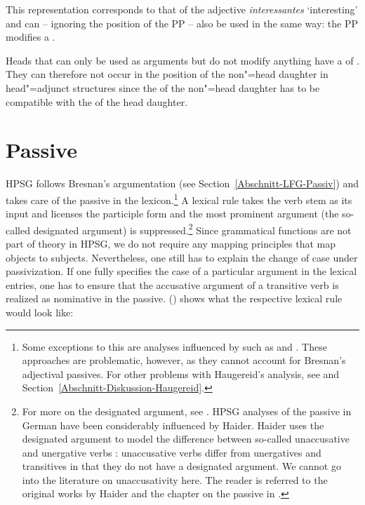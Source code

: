 \noindent
This representation corresponds to that of the adjective \emph{interessantes} `interesting' and can -- ignoring the position of the PP -- also be used in the same way:
the PP modifies a \nbar.

Heads that can only be used as arguments but do not modify anything have a \modv of .
They can therefore not occur in the position of the non"=head daughter in head"=adjunct structures since the \modv of the non"=head daughter has to be compatible
with the \synsemv of the head daughter.

\section{Passive}
\label{Abschnitt-HPSG-Passiv}\label{sec-hpsg-passive}

HPSG follows Bresnan's argumentation (see Section~\ref{Abschnitt-LFG-Passiv}) and takes care of the passive in the lexicon.\footnote{
	Some exceptions to this are analyses influenced by \cxg such as \citet{Tseng2007a} and \citet{Haugereid2007a}.
	These approaches are problematic, however, as they cannot account for Bresnan's adjectival passives. For other problems with
	Haugereid's analysis, see  and Section~\ref{Abschnitt-Diskussion-Haugereid}.%
} A lexical rule takes the verb stem as its input and licenses the participle form and the most prominent argument (the so-called
designated argument) is suppressed.\footnote{
	For more on the designated argument, see . HPSG analyses of the passive in German have been considerably influenced by Haider.
	Haider uses the designated argument to model the difference between so-called unaccusative
        and unergative verbs \citep{Perlmutter78}: unaccusative verbs differ from unergatives and transitives in that they do not have
	a designated argument. We cannot go into the literature on unaccusativity here. The reader is referred to the original works by Haider and the
	chapter on the passive in .
}
Since grammatical functions are not part of theory in HPSG, we do not require any mapping principles that map objects to subjects.
Nevertheless, one still has to explain the change of case under passivization. If one fully
specifies the case of a particular argument in the lexical entries, one has to ensure that the
accusative argument of a transitive verb is realized as nominative in the passive. () shows
what the respective lexical rule would look like:

